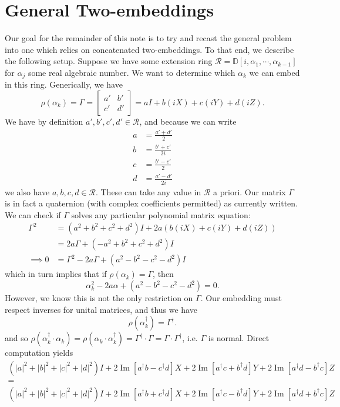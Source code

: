 \documentclass{article}
\theoremstyle{definition}
\theoremstyle{theorem}
\theoremstyle{remark}
\renewcommand{\Im}{\operatorname{Im}}
\begin{document}
	\section{General Two-embeddings}
	Our goal for the remainder of this note is to try and recast the general problem into one which relies on concatenated two-embeddings. To that end, we describe the following setup. Suppose we have some extension ring $\mathcal{R}=\mathbb{D}[i,\alpha_1,\cdots,\alpha_{k-1}]$ for $\alpha_j$ some real algebraic number. We want to determine which $\alpha_k$ we can embed in this ring. Generically, we have
	\[
		\rho(\alpha_k) = \Gamma = \begin{bmatrix}
		a' & b' \\ c' & d'
		\end{bmatrix} = a I + b(iX) + c(iY) + d (iZ).
	\]
	We have by definition $a',b',c',d'\in \mathcal{R}$, and because we can write
	\begin{align*}
		a &=\frac{a' + d'}{2}\\
		b &= \frac{b' + c'}{2 i}\\
		c &= \frac{b'-c'}{2}\\
		d &= \frac{a'-d'}{2 i}
	\end{align*}
	we also have $a,b,c,d\in\mathcal{R}$. These can take any value in $\mathcal{R}$ a priori. Our matrix $\Gamma$ is in fact a quaternion (with complex coefficients permitted) as currently written. We can check if $\Gamma$ solves any particular polynomial matrix equation:
	\begin{align*}
		\Gamma^2 &= (a^2 + b^2 + c^2 + d^2) I + 2a(b(iX) + c(iY)+ d(iZ))\\
		 &= 2a \Gamma + (-a^2+b^2+c^2+d^2)I\\
		 \implies 0 &= \Gamma^2 - 2a \Gamma + (a^2-b^2-c^2-d^2)I
	\end{align*}
	which in turn implies that if $\rho(\alpha_k) = \Gamma$, then
	\[
		\alpha_k^2 - 2a \alpha + (a^2-b^2-c^2-d^2) = 0.
	\]
	However, we know this is not the only restriction on $\Gamma$. Our embedding must respect inverses for unital matrices, and thus we have
	\[
		\rho(\alpha_k^\dagger) = \Gamma^\dagger.
	\]
	and so $\rho(\alpha_k^\dagger\cdot \alpha_k) = \rho(\alpha_k\cdot \alpha_k^\dagger) = \Gamma^\dagger \cdot\Gamma = \Gamma\cdot \Gamma^\dagger$, i.e. $\Gamma$ is normal. Direct computation yields
	\[
		\begin{array}{c}
			(|a|^2 + |b|^2+|c|^2 + |d|^2) I  + 2\Im[a^\dagger b - c^\dagger d] X + 2\Im[a^\dagger c+b^\dagger d ] Y + 2\Im[a^\dagger d -b^\dagger c] Z\\
			=\\
			(|a|^2 + |b|^2+|c|^2 + |d|^2) I  + 2\Im[a^\dagger b + c^\dagger d]X + 2\Im[a^\dagger c-b^\dagger d ] Y + 2\Im[a^\dagger d +b^\dagger c] Z
		\end{array}
	\]
\end{document}
